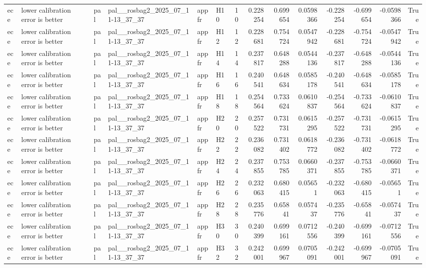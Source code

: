 \begin{longtable}{llllllrrrrrrrr}
ece & lower calibration error is better & pal & pal\_\_rosbag2\_2025\_07\_11-13\_37\_37 & appfr & H10 & 10 & 0.228254 & 0.699654 & 0.0598366 & -0.228254 & -0.699654 & -0.0598366 & True \\
ece & lower calibration error is better & pal & pal\_\_rosbag2\_2025\_07\_11-13\_37\_37 & appfr & H12 & 12 & 0.228681 & 0.754724 & 0.0547942 & -0.228681 & -0.754724 & -0.0547942 & True \\
ece & lower calibration error is better & pal & pal\_\_rosbag2\_2025\_07\_11-13\_37\_37 & appfr & H14 & 14 & 0.237817 & 0.648288 & 0.0544136 & -0.237817 & -0.648288 & -0.0544136 & True \\
ece & lower calibration error is better & pal & pal\_\_rosbag2\_2025\_07\_11-13\_37\_37 & appfr & H16 & 16 & 0.240541 & 0.648634 & 0.0585178 & -0.240541 & -0.648634 & -0.0585178 & True \\
ece & lower calibration error is better & pal & pal\_\_rosbag2\_2025\_07\_11-13\_37\_37 & appfr & H18 & 18 & 0.254564 & 0.733624 & 0.0610837 & -0.254564 & -0.733624 & -0.0610837 & True \\
ece & lower calibration error is better & pal & pal\_\_rosbag2\_2025\_07\_11-13\_37\_37 & appfr & H20 & 20 & 0.257522 & 0.731731 & 0.0615295 & -0.257522 & -0.731731 & -0.0615295 & True \\
ece & lower calibration error is better & pal & pal\_\_rosbag2\_2025\_07\_11-13\_37\_37 & appfr & H22 & 22 & 0.236082 & 0.731402 & 0.0618772 & -0.236082 & -0.731402 & -0.0618772 & True \\
ece & lower calibration error is better & pal & pal\_\_rosbag2\_2025\_07\_11-13\_37\_37 & appfr & H24 & 24 & 0.237855 & 0.753785 & 0.0660371 & -0.237855 & -0.753785 & -0.0660371 & True \\
ece & lower calibration error is better & pal & pal\_\_rosbag2\_2025\_07\_11-13\_37\_37 & appfr & H26 & 26 & 0.232063 & 0.680415 & 0.05651 & -0.232063 & -0.680415 & -0.05651 & True \\
ece & lower calibration error is better & pal & pal\_\_rosbag2\_2025\_07\_11-13\_37\_37 & appfr & H28 & 28 & 0.235776 & 0.65841 & 0.057437 & -0.235776 & -0.65841 & -0.057437 & True \\
ece & lower calibration error is better & pal & pal\_\_rosbag2\_2025\_07\_11-13\_37\_37 & appfr & H30 & 30 & 0.240399 & 0.699161 & 0.0712556 & -0.240399 & -0.699161 & -0.0712556 & True \\
ece & lower calibration error is better & pal & pal\_\_rosbag2\_2025\_07\_11-13\_37\_37 & appfr & H32 & 32 & 0.242001 & 0.699967 & 0.0705091 & -0.242001 & -0.699967 & -0.0705091 & True \\

\end{longtable}
